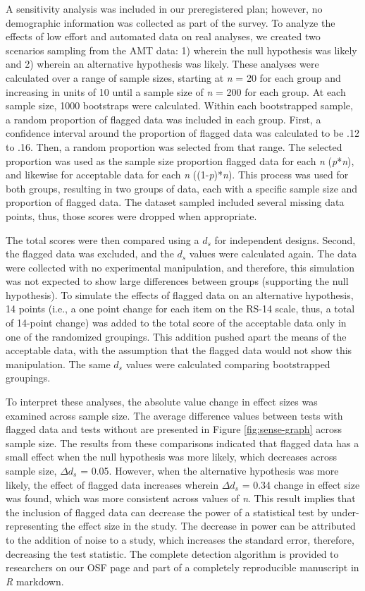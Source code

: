 \documentclass[english,man]{apa6}
\theoremstyle{definition}
\theoremstyle{definition}
\theoremstyle{definition}
\theoremstyle{remark}
\begin{document}
A sensitivity analysis was included in our preregistered plan; however,
no demographic information was collected as part of the survey. To
analyze the effects of low effort and automated data on real analyses,
we created two scenarios sampling from the AMT data: 1) wherein the null
hypothesis was likely and 2) wherein an alternative hypothesis was
likely. These analyses were calculated over a range of sample sizes,
starting at \emph{n} = 20 for each group and increasing in units of 10
until a sample size of \emph{n} = 200 for each group. At each sample
size, 1000 bootstraps were calculated. Within each bootstrapped sample,
a random proportion of flagged data was included in each group. First, a
confidence interval around the proportion of flagged data was calculated
to be .12 to .16. Then, a random proportion was selected from that
range. The selected proportion was used as the sample size proportion
flagged data for each \emph{n} (\emph{p}*\emph{n}), and likewise for
acceptable data for each \emph{n} ((1-\emph{p})*\emph{n}). This process
was used for both groups, resulting in two groups of data, each with a
specific sample size and proportion of flagged data. The dataset sampled
included several missing data points, thus, those scores were dropped
when appropriate.

The total scores were then compared using a \(d_s\) for independent
designs. Second, the flagged data was excluded, and the \(d_s\) values
were calculated again. The data were collected with no experimental
manipulation, and therefore, this simulation was not expected to show
large differences between groups (supporting the null hypothesis). To
simulate the effects of flagged data on an alternative hypothesis, 14
points (i.e., a one point change for each item on the RS-14 scale, thus,
a total of 14-point change) was added to the total score of the
acceptable data only in one of the randomized groupings. This addition
pushed apart the means of the acceptable data, with the assumption that
the flagged data would not show this manipulation. The same \(d_s\)
values were calculated comparing bootstrapped groupings.

To interpret these analyses, the absolute value change in effect sizes
was examined across sample size. The average difference values between
tests with flagged data and tests without are presented in Figure
\ref{fig:sense-graph} across sample size. The results from these
comparisons indicated that flagged data has a small effect when the null
hypothesis was more likely, which decreases across sample size,
\(\Delta d_s\) = 0.05. However, when the alternative hypothesis was more
likely, the effect of flagged data increases wherein \(\Delta d_s\) =
0.34 change in effect size was found, which was more consistent across
values of \emph{n}. This result implies that the inclusion of flagged
data can decrease the power of a statistical test by under-representing
the effect size in the study. The decrease in power can be attributed to
the addition of noise to a study, which increases the standard error,
therefore, decreasing the test statistic. The complete detection
algorithm is provided to researchers on our OSF page and part of a
completely reproducible manuscript in \emph{R} markdown.
\end{document}

